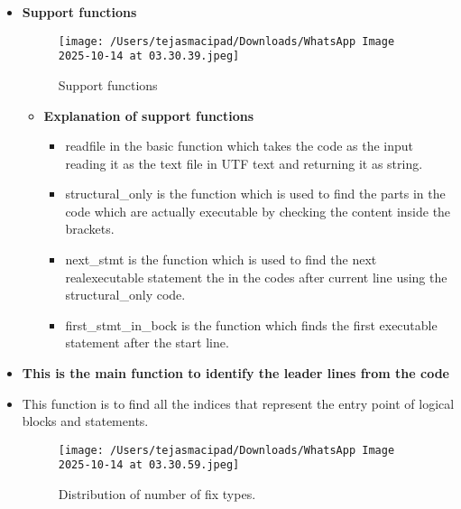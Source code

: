 \documentclass[12pt, a4paper]{report}
\begin{document}
\begin{itemize}
    \item \textbf{Support functions}
        \begin{figure}[h!]
            \centering
            \texttt{[image: /Users/tejasmacipad/Downloads/WhatsApp Image 2025-10-14 at 03.30.39.jpeg]}
            \caption{Support functions}
            \label{fig:diff-example2}
        \end{figure}

        \begin{itemize}
            \item \textbf{Explanation of support functions}
            \begin{itemize}
                \item readfile in the basic function which takes the code as the input reading it as the text file in UTF text and returning it as string.
                \item structural\_only is the function which is used to find the parts in the code which are actually executable by checking the content inside the {} brackets.
                \item next\_stmt is the function which is used to find the next real\/executable statement the in the codes after current line using the structural\_only code.
                \item first\_stmt\_in\_bock is the function which finds the first executable statement after the start line.
            \end{itemize}
        \end{itemize}

    \item \textbf{This is the main function to identify the leader lines from the code}
    \item This function is to find all the indices that represent the entry point of logical blocks and statements.
        \begin{figure}[h!]
            \centering
            \texttt{[image: /Users/tejasmacipad/Downloads/WhatsApp Image 2025-10-14 at 03.30.59.jpeg]}
            \caption{Distribution of number of fix types.}
            \label{fig:diff-example-3}
        \end{figure}


\end{itemize}
\end{document}
